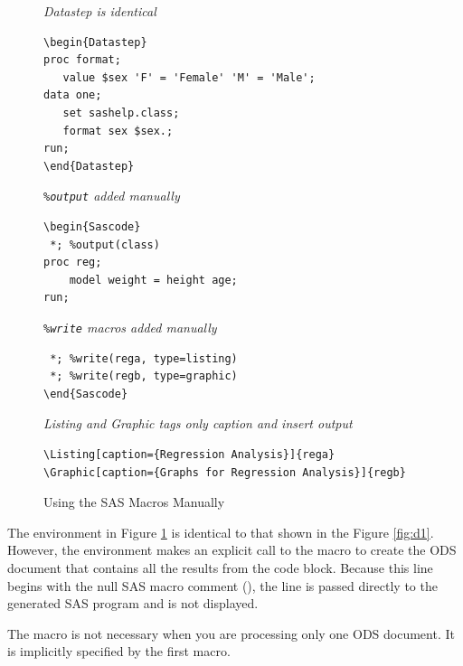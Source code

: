 \documentclass[article,oneside]{memoir}
\begin{document}
\begin{figure}[H]
\begin{framed}
\begin{snugshade}
{\hfil\textit{Datastep is identical}\hfil}
\begin{verbatim}
\begin{Datastep}
proc format;
   value $sex 'F' = 'Female' 'M' = 'Male';
data one;
   set sashelp.class;
   format sex $sex.;
run;
\end{Datastep}
\end{verbatim}
\end{snugshade}
\begin{snugshade}
{\hfil\textit{\texttt{\%output} added manually}\hfil}
\begin{verbatim}
\begin{Sascode}
 *; %output(class)
proc reg;
    model weight = height age;
run;
\end{verbatim}
\end{snugshade}
\begin{snugshade}
{\hfil\textit{\texttt{\%write} macros added manually}\hfil}
\begin{verbatim}
 *; %write(rega, type=listing)
 *; %write(regb, type=graphic)
\end{Sascode}
\end{verbatim}
\end{snugshade}
\begin{snugshade}
{\hfil\textit{Listing and Graphic tags only caption and insert output}\hfil}
\begin{verbatim}
\Listing[caption={Regression Analysis}]{rega}
\Graphic[caption={Graphs for Regression Analysis}]{regb}
\end{verbatim}
\end{snugshade}
\end{framed}
\caption{Using the SAS Macros Manually}\label{fig:manual}
\end{figure}

  The  environment in Figure \ref{fig:manual} is identical to that shown in the
  Figure \ref{fig:d1}. However, the 
  environment makes an explicit call to the  macro to create
  the ODS document that contains all the results from the code block.
  Because this line begins with the null SAS macro comment (\Code{\%*;}), the line
  is passed directly to the generated SAS program and is not displayed.

  The  macro is not necessary when you are processing
  only one ODS document. It is implicitly specified by the first  macro.
\end{document}
